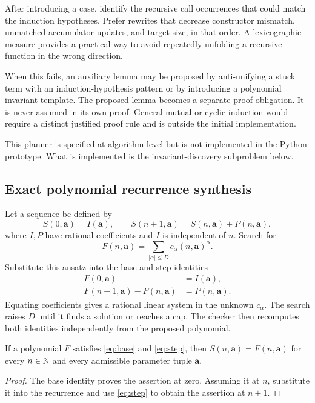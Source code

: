 After introducing a case, identify the recursive call occurrences that could match the induction hypotheses. Prefer rewrites that decrease constructor mismatch, unmatched accumulator updates, and target size, in that order. A lexicographic measure provides a practical way to avoid repeatedly unfolding a recursive function in the wrong direction.

When this fails, an auxiliary lemma may be proposed by anti-unifying a stuck term with an induction-hypothesis pattern or by introducing a polynomial invariant template. The proposed lemma becomes a separate proof obligation. It is never assumed in its own proof. General mutual or cyclic induction would require a distinct justified proof rule and is outside the initial implementation.

This planner is specified at algorithm level but is not implemented in the Python prototype. What is implemented is the invariant-discovery subproblem below.

\subsection{Exact polynomial recurrence synthesis}

Let a sequence be defined by
\[
 S(0,\bm a)=I(\bm a),\qquad
 S(n+1,\bm a)=S(n,\bm a)+P(n,\bm a),
\]
where $I,P$ have rational coefficients and $I$ is independent of $n$. Search for
\[
 F(n,\bm a)=\sum_{|\alpha|\le D}c_\alpha(n,\bm a)^\alpha.
\]
Substitute this ansatz into the base and step identities
\begin{align}
 F(0,\bm a)&=I(\bm a),\label{eq:base}\\
 F(n+1,\bm a)-F(n,\bm a)&=P(n,\bm a).\label{eq:step}
\end{align}
Equating coefficients gives a rational linear system in the unknown $c_\alpha$. The search raises $D$ until it finds a solution or reaches a cap. The checker then recomputes both identities independently from the proposed polynomial.

\begin{proposition}
If a polynomial $F$ satisfies \eqref{eq:base} and \eqref{eq:step}, then $S(n,\bm a)=F(n,\bm a)$ for every $n\in\mathbb{N}$ and every admissible parameter tuple $\bm a$.
\end{proposition}
\begin{proof}
The base identity proves the assertion at zero. Assuming it at $n$, substitute it into the recurrence and use \eqref{eq:step} to obtain the assertion at $n+1$.
\end{proof}

